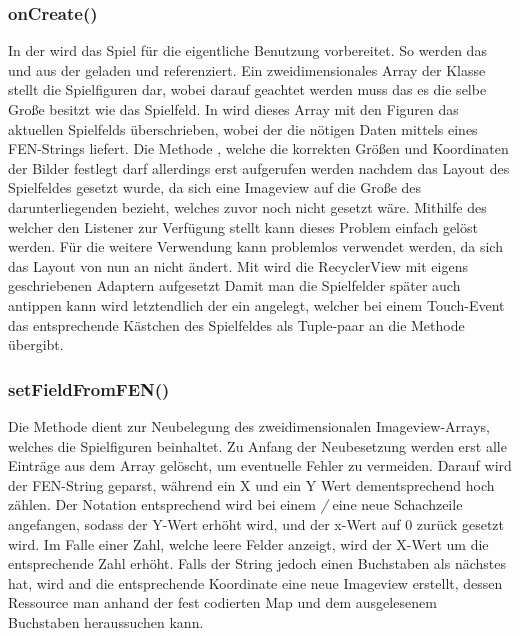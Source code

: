 \subsubsection{onCreate()}
In der  wird das Spiel für die eigentliche Benutzung 
vorbereitet. So werden das  und  
aus der  geladen und referenziert. Ein zweidimensionales Array 
der Klasse  stellt die Spielfiguren dar, wobei darauf geachtet 
werden muss das es die selbe Große besitzt wie das Spielfeld. In 
 wird dieses Array mit den Figuren das aktuellen 
Spielfelds überschrieben, wobei der  die nötigen Daten 
mittels eines FEN-Strings liefert. Die Methode , welche die 
korrekten Größen und Koordinaten der Bilder festlegt darf allerdings erst 
aufgerufen werden nachdem das Layout des Spielfeldes gesetzt wurde, da sich eine 
Imageview auf die Große des darunterliegenden  bezieht, welches zuvor 
noch nicht gesetzt wäre. Mithilfe des  welcher den 
Listener  zur Verfügung stellt kann dieses 
Problem einfach gelöst werden. Für die weitere Verwendung kann 
 problemlos verwendet werden, da sich das Layout von nun an 
nicht ändert. Mit  wird die RecyclerView mit eigens 
geschriebenen Adaptern aufgesetzt\newline
Damit man die Spielfelder später auch antippen kann wird letztendlich der 
 ein  angelegt, welcher bei 
einem Touch-Event das entsprechende Kästchen des Spielfeldes als Tuple-paar an 
die Methode  übergibt.

\subsubsection{setFieldFromFEN()}

Die Methode  dient zur Neubelegung des zweidimensionalen 
Imageview-Arrays, welches die Spielfiguren beinhaltet. Zu Anfang der 
Neubesetzung werden erst alle Einträge aus dem Array gelöscht, um eventuelle 
Fehler zu vermeiden. Darauf wird der FEN-String geparst, während ein X und ein Y 
Wert dementsprechend hoch zählen. Der Notation entsprechend wird bei einem 
\emph{/} eine neue Schachzeile angefangen, sodass der Y-Wert erhöht wird, und 
der x-Wert auf 0 zurück gesetzt wird. Im Falle einer Zahl, welche leere Felder 
anzeigt, wird der X-Wert um die entsprechende Zahl erhöht. Falls der String 
jedoch einen Buchstaben als nächstes hat, wird and die entsprechende Koordinate 
eine neue Imageview erstellt, dessen Ressource man anhand der fest codierten Map 
und dem ausgelesenem Buchstaben heraussuchen kann.

